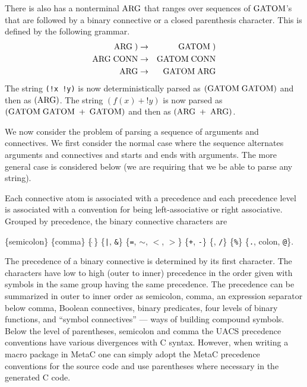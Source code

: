 \documentclass{article}
\newcommand{\mtt}[1]{\mbox{\tt #1}}
\begin{document}
There is also has a nonterminal $\mathrm{ARG}$ that ranges over sequences of $\mathrm{GATOM}$'s that are followed by a binary connective or a closed parenthesis character.
This is defined by the following grammar.
\begin{eqnarray*}
  \mathrm{ARG}\;) & \rightarrow & \mathrm{GATOM}\;) \\
  \mathrm{ARG}\; \mathrm{CONN} & \rightarrow & \mathrm{GATOM}\; \mathrm{CONN} \\
  \mathrm{ARG} & \rightarrow & \mathrm{GATOM} \; \mathrm{ARG}
\end{eqnarray*}
The string {\tt (!x !y)} is now deterministically parsed as $(\mathrm{GATOM}\; \mathrm{GATOM})$ and then as $(\mathrm{ARG})$.  The string $(f(x) + !y)$ is now
parsed as $(\mathrm{GATOM}\;\mathrm{GATOM}\; +\; \mathrm{GATOM})$ and then as $(\mathrm{ARG}\; + \;\mathrm{ARG})$.

We now consider the problem of parsing a sequence of arguments and connectives.  We first consider the normal case
where the sequence alternates arguments and connectives and starts and ends with arguments.
The more general case is considered below (we are requiring that we be able to parse any string).

Each connective atom is associated with a precedence and each precedence level is associated with a convention for being left-associative or right associative.
Grouped by precedence, the binary connective characters are

\medskip
\centerline{\{semicolon\} \{comma\}  \{$\hat{\mathtt{~}}$\}
  \{\mtt{|}, {\tt \&}\} \{{\tt =}, {\tt $\sim$}, {\tt $<$}, {\tt $>$}\} \{{\tt +}, {\tt -}\} \{{\tt *}, {\tt /}\} \{{\tt \%}\} \{{\tt .}, colon,  {\tt @}\}.}

The precedence of a binary connective is determined by its first character.  The characters have low to high (outer to inner) precedence in the order given with symbols
in the same group having the same precedence.  The precedence can be summarized in outer to inner order as semicolon, comma, an expression separator below comma,
Boolean connectives, binary predicates,
four levels of binary functions, and ``symbol connectives'' --- ways of building compound symbols.  Below the level of parentheses, semicolon and comma the UACS precedence
conventions have various divergences with C syntax.  However, when writing a macro package in MetaC one can simply adopt the MetaC precedence conventions for the
source code and use parentheses where necessary in the generated C code.
\end{document}
